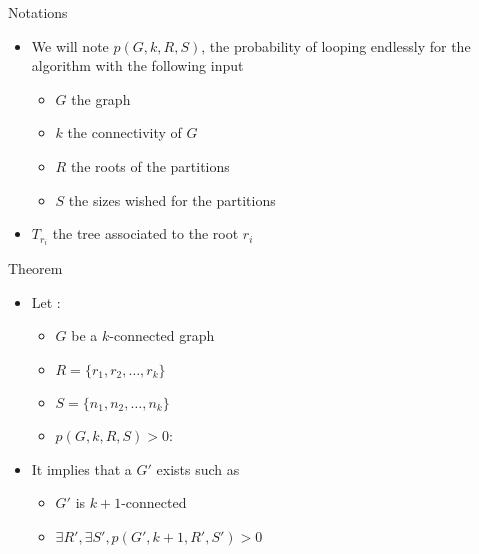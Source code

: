 
\begin{frame}{Notations}
  \begin{itemize}
  \item We will note $p(G,k,R,S)$, the probability
    of looping endlessly for the algorithm with the following input
    \begin{itemize}
      \item $G$ the graph
      \item $k$ the connectivity of $G$
      \item $R$ the roots of the partitions
      \item $S$ the sizes wished for the partitions
    \end{itemize}
  \item $T_{r_i}$ the tree associated to the root $r_i$
  \end{itemize}
\end{frame}

\begin{frame}{Theorem}
  \begin{itemize}
  \item Let :
    \begin{itemize}
    \item $G$ be a $k$-connected graph
    \item $R = \{r_1,r_2, \dots, r_k\}$
    \item $S = \{n_1,n_2, \dots, n_k\}$
    \item $p(G,k,R,S) > 0$:
    \end{itemize}
  \item It implies that a $G'$ exists such as
    \begin{itemize}
    \item $G'$ is $k+1$-connected
    \item $\exists R', \exists S', p(G',k + 1, R', S') > 0$
    \end{itemize}
  \end{itemize}
\end{frame}

